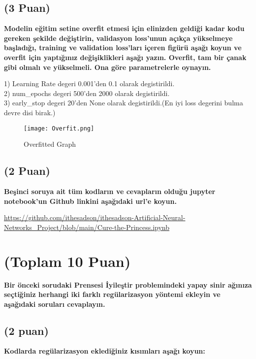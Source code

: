 \documentclass[11pt]{article}
\begin{document}
\subsection{(3 Puan)} \textbf{Modelin eğitim setine overfit etmesi için elinizden geldiği kadar kodu gereken şekilde değiştirin, validasyon loss'unun açıkça yükselmeye başladığı, training ve validation loss'ları içeren figürü aşağı koyun ve overfit için yaptığınız değişiklikleri aşağı yazın. Overfit, tam bir çanak gibi olmalı ve yükselmeli. Ona göre parametrelerle oynayın.}

1) Learning Rate degeri 0.001'den 0.1 olarak degistirildi.\\ 
2) num\_epochs degeri 500'den 2000 olarak degistirildi. \\
3) early\_stop degeri 20'den None olarak degistirildi.(En iyi loss degerini bulma devre disi birak.)

\begin{figure}[ht!]
    \centering
    \texttt{[image: Overfit.png]}
    \caption{Overfitted Graph}
    \label{fig:my_pic}
\end{figure}

\subsection{(2 Puan)} \textbf{Beşinci soruya ait tüm kodların ve cevapların olduğu jupyter notebook'un Github linkini aşağıdaki url'e koyun.}

\url{https://github.com/ithesadson/ithesadson-Artificial-Neural-Networks_Project/blob/main/Cure-the-Princess.ipynb}

\section{(Toplam 10 Puan)} \textbf{Bir önceki sorudaki Prensesi İyileştir problemindeki yapay sinir ağınıza seçtiğiniz herhangi iki farklı regülarizasyon yöntemi ekleyin ve aşağıdaki soruları cevaplayın.} 

\subsection{(2 puan)} \textbf{Kodlarda regülarizasyon eklediğiniz kısımları aşağı koyun:} 
\end{document}
